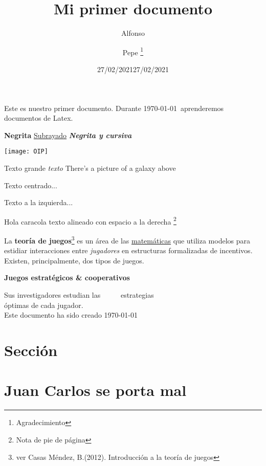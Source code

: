 \documentclass[a4paper, 11pt]{article}  %
\title{Mi primer documento} %
\author{Alfonso \and Pepe \thanks{Agradecimiento}}
\date{27/02/2021}
\begin{document}
	\maketitle
	\tableofcontents %
	Este es nuestro primer documento. Durante \today \ aprenderemos documentos de Latex.\date{27/02/2021}
	\textbf{Negrita}
	\underline{Subrayado}
	\textbf{\textit{Negrita y cursiva}}	
	
	\texttt{[image: OIP]}
	
	
	{\Huge{Texto grande}}
	{\tiny{\textit{texto}}}
	There's a picture of a galaxy above
	\ %
	\\ %
	
	\begin{center}
		Texto centrado...
	\end{center}
	
	\begin{flushleft}
		Texto a la izquierda...
	\end{flushleft}
	
	Hola caracola \hfill texto alineado con espacio a la derecha
	\footnote{Nota de pie de página}
	
	\newpage
	\setcounter{footnote}{1}
	\noindent La \textbf{teoría de juegos}\footnote{ver Casas Méndez, B.(2012). Introducción a la teoría de juegos} es un área de las \underline{matemáticas} que utiliza modelos para estidiar interacciones entre \textit{jugadores} en estructuras formalizadas de incentivos. Existen, principalmente, dos tipos de juegos.\\
	\begin{center}
		{\large{\textbf{Juegos estratégicos \& cooperativos}}}\\
	\end{center}
	
	\noindent Sus investigadores estudian las \ \ \ \ \ estrategias \\ óptimas de cada jugador.\\
	Este documento ha sido creado \dotfill \today
	 
	\section*{Sección} %
	\section{Juan Carlos se porta mal}
\end{document}
